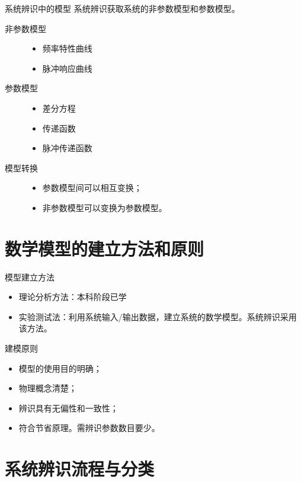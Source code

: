 \begin{frame}{系统辨识中的模型}
   系统辨识获取系统的非参数模型和参数模型。
\begin{description}
\item[非参数模型]
\begin{itemize}
\item 频率特性曲线
\item 脉冲响应曲线
\end{itemize}
\item[参数模型]
\begin{itemize}
\item 差分方程
\item 传递函数
\item 脉冲传递函数
\end{itemize}
\item[模型转换]
\begin{itemize}
\item 参数模型间可以相互变换；
\item 非参数模型可以变换为参数模型。
\end{itemize}
\end{description}
\end{frame}

\section{数学模型的建立方法和原则}
\begin{frame}{模型建立方法}
\begin{itemize}
\item    理论分析方法：本科阶段已学
\item    实验测试法：利用系统输入/输出数据，建立系统的数学模型。系统辨识采用该方法。
\end{itemize}
\end{frame}

\begin{frame}{建模原则}
\begin{itemize}
\item 模型的使用目的明确； 
\item 物理概念清楚；
\item 辨识具有无偏性和一致性；
\item 符合节省原理。需辨识参数数目要少。
\end{itemize}
\end{frame}

\section{系统辨识流程与分类}


